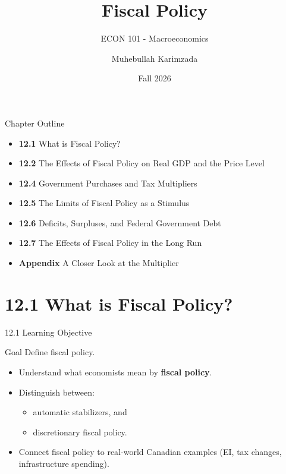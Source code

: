 \documentclass[aspectratio=169]{beamer}
\title{\textbf{Fiscal Policy \vspace{.5cm}\\  }}
\subtitle{ {\large ECON 101 - Macroeconomics}}
\author{Muhebullah Karimzada}
\date{Fall 2026}
\begin{document}
\begin{frame}[plain]
  \titlepage
\end{frame}

\begin{frame}{Chapter Outline}
\transfade
\begin{itemize}
  \item \textbf{12.1} What is Fiscal Policy?
  \item \textbf{12.2} The Effects of Fiscal Policy on Real GDP and the Price Level
  \item \textbf{12.4} Government Purchases and Tax Multipliers
  \item \textbf{12.5} The Limits of Fiscal Policy as a Stimulus
  \item \textbf{12.6} Deficits, Surpluses, and Federal Government Debt
  \item \textbf{12.7} The Effects of Fiscal Policy in the Long Run
  \item \textbf{Appendix} A Closer Look at the Multiplier
\end{itemize}
\end{frame}

\section{12.1 What is Fiscal Policy?}

\begin{frame}{12.1 Learning Objective}
\transfade
\begin{block}{Goal}
Define fiscal policy.
\end{block}
\begin{itemize}
  \item Understand what economists mean by \textbf{fiscal policy}.
  \item Distinguish between:
  \begin{itemize}
    \item automatic stabilizers, and
    \item discretionary fiscal policy.
  \end{itemize}
  \item Connect fiscal policy to real-world Canadian examples (EI, tax changes, infrastructure spending).
\end{itemize}
\end{frame}
\end{document}
